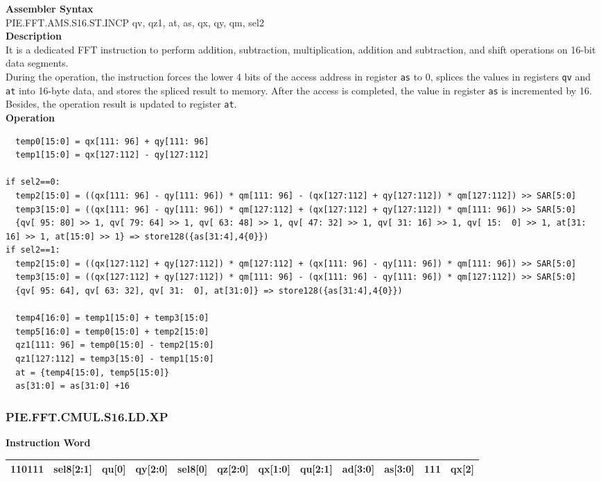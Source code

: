\textbf{Assembler Syntax} \\
PIE.FFT.AMS.S16.ST.INCP qv, qz1, at, as, qx, qy, qm, sel2 \\
\textbf{Description} \\
It is a dedicated FFT instruction to perform addition, subtraction, multiplication, addition and subtraction, and shift operations on 16-bit data segments.\\
During the operation, the instruction forces the lower 4 bits of the access address in register \lstinline{as} to 0, splices the values in registers \lstinline{qv} and \lstinline{at} into 16-byte data, and stores the spliced result to memory. After the access is completed, the value in register \lstinline{as} is incremented by 16. Besides, the operation result is updated to register \lstinline{at}.\\
\textbf{Operation}
\begin{lstlisting}
  temp0[15:0] = qx[111: 96] + qy[111: 96]
  temp1[15:0] = qx[127:112] - qy[127:112]

if sel2==0:
  temp2[15:0] = ((qx[111: 96] - qy[111: 96]) * qm[111: 96] - (qx[127:112] + qy[127:112]) * qm[127:112]) >> SAR[5:0]
  temp3[15:0] = ((qx[111: 96] - qy[111: 96]) * qm[127:112] + (qx[127:112] + qy[127:112]) * qm[111: 96]) >> SAR[5:0]
  {qv[ 95: 80] >> 1, qv[ 79: 64] >> 1, qv[ 63: 48] >> 1, qv[ 47: 32] >> 1, qv[ 31: 16] >> 1, qv[ 15:  0] >> 1, at[31: 16] >> 1, at[15:0] >> 1} => store128({as[31:4],4{0}})
if sel2==1:
  temp2[15:0] = ((qx[127:112] + qy[127:112]) * qm[127:112] + (qx[111: 96] - qy[111: 96]) * qm[111: 96]) >> SAR[5:0]
  temp3[15:0] = ((qx[127:112] + qy[127:112]) * qm[111: 96] - (qx[111: 96] - qy[111: 96]) * qm[127:112]) >> SAR[5:0]
  {qv[ 95: 64], qv[ 63: 32], qv[ 31:  0], at[31:0]} => store128({as[31:4],4{0}})

  temp4[16:0] = temp1[15:0] + temp3[15:0]
  temp5[16:0] = temp0[15:0] + temp2[15:0]
  qz1[111: 96] = temp0[15:0] - temp2[15:0]
  qz1[127:112] = temp3[15:0] - temp1[15:0]
  at = {temp4[15:0], temp5[15:0]}
  as[31:0] = as[31:0] +16
\end{lstlisting}

\newpage
\subsubsection{PIE.FFT.CMUL.S16.LD.XP}\label{instruction:PIEFFTCMULS16LDXP}
\setlength\tabcolsep{6pt}
\textbf{Instruction Word} \\
\begin{tabular}{|c|c|c|c|c|c|c|c|c|c|c|c|}
	\hline
	110111 & sel8[2:1] & qu[0] & qy[2:0] & sel8[0] & qz[2:0] & qx[1:0] & qu[2:1] & ad[3:0] & as[3:0] & 111 & qx[2] \\
	\hline
\end{tabular}

